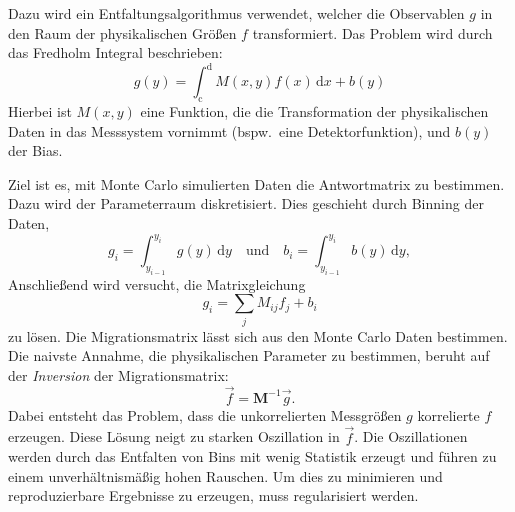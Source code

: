 
Dazu wird ein
Entfaltungsalgorithmus verwendet,
welcher die Observablen $g$
in den Raum der physikalischen Größen $f$ transformiert.
Das Problem wird durch das Fredholm Integral beschrieben:
\begin{equation}
	g(y) = \int_\text{c}^\text{d} M(x,y) f(x) \, \text{d}x + b(y)
\end{equation}
Hierbei ist $M(x, y)$ eine Funktion, die die Transformation der physikalischen
Daten in das Messsystem vornimmt (bspw.\ eine Detektorfunktion), und $b(y)$ der Bias.

Ziel ist es, mit Monte Carlo simulierten Daten
die Antwortmatrix zu bestimmen.
Dazu wird der Parameterraum diskretisiert.
Dies geschieht durch Binning der Daten,
\begin{equation}
	g_i = \int_{y_{i-1}}^{y_i} g(y) \, \text{d}y \quad \text{und} \quad
	b_i = \int_{y_{i-1}}^{y_i} b(y) \, \text{d}y,
\end{equation}
Anschließend wird versucht, die Matrixgleichung
\begin{equation}
	g_i = \sum_j M_{ij} f_j + b_i
\end{equation}
zu lösen.
Die Migrationsmatrix lässt sich aus den Monte Carlo Daten
bestimmen.
Die naivste Annahme, die physikalischen Parameter zu bestimmen,
beruht auf der \textit{Inversion} der Migrationsmatrix:
\begin{equation}
    \vec{f} = \mathbf{M}^{-1} \vec{g}.
\end{equation}
Dabei entsteht das Problem, dass die unkorrelierten Messgrößen $g$
korrelierte $f$ erzeugen.
Diese
Lösung
neigt
zu starken Oszillation in $\vec{f}$.
Die Oszillationen werden durch das Entfalten von Bins mit wenig Statistik
erzeugt und führen
zu einem unverhältnismäßig hohen Rauschen.
Um dies zu minimieren und reproduzierbare Ergebnisse zu erzeugen,
muss regularisiert werden.

